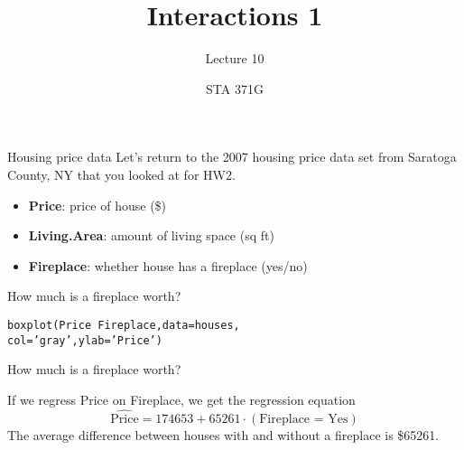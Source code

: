 \documentclass{beamer}\usepackage[]{graphicx}\usepackage[]{color}
\title{Interactions 1}
\subtitle{Lecture 10}
\author{STA 371G}
\makeatletter
\newcommand{\hlstr}[1]{\textcolor[rgb]{1,0.894,0.71}{#1}}%
\newcommand{\hlopt}[1]{\textcolor[rgb]{1,0.894,0.769}{#1}}%
\newcommand{\hlstd}[1]{\textcolor[rgb]{1,0.894,0.769}{#1}}%
\newcommand{\hlkwc}[1]{\textcolor[rgb]{0.78,0.941,0.545}{#1}}%
\newcommand{\hlkwd}[1]{\textcolor[rgb]{1,0.78,0.769}{#1}}%
\newenvironment{kframe}{%
 \def\at@end@of@kframe{}%
 \ifinner\ifhmode%
  \def\at@end@of@kframe{\end{minipage}}%
  \begin{minipage}{\columnwidth}%
 \fi\fi%
 \def\FrameCommand##1{\hskip\@totalleftmargin \hskip-\fboxsep
 \colorbox{shadecolor}{##1}\hskip-\fboxsep
     \hskip-\linewidth \hskip-\@totalleftmargin \hskip\columnwidth}%
 \MakeFramed {\advance\hsize-\width
   \@totalleftmargin\z@ \linewidth\hsize
   \@setminipage}}%
 {\par\unskip\endMakeFramed%
 \at@end@of@kframe}
\newenvironment{knitrout}{}{} %
\makeatother
\begin{document}
  
  

  \frame{\maketitle}



  \begin{darkframes}
    \begin{frame}{Housing price data}
      Let's return to the 2007 housing price data set from Saratoga County, NY that you looked at for HW2.
      \begin{itemize}
        \item \textbf{Price}: price of house (\$)
        \item \textbf{Living.Area}: amount of living space (sq ft)
        \item \textbf{Fireplace}: whether house has a fireplace (yes/no)
      \end{itemize}
      \lc
    \end{frame}

    \begin{frame}[fragile]{How much is a fireplace worth?}
\begin{knitrout}
\begin{kframe}
\begin{alltt}
\hlkwd{boxplot}\hlstd{(Price} \hlopt{~} \hlstd{Fireplace,} \hlkwc{data}\hlstd{=houses,}
  \hlkwc{col}\hlstd{=}\hlstr{'gray'}\hlstd{,} \hlkwc{ylab}\hlstd{=}\hlstr{'Price'}\hlstd{)}
\end{alltt}
\end{kframe}


\end{knitrout}
    \end{frame}

    \begin{frame}[fragile]{How much is a fireplace worth?}
      

      If we regress Price on Fireplace, we get the regression equation
      \[
        \widehat{\text{Price}} = 174653 + 65261\cdot(\text{Fireplace = Yes})
      \]
      The average difference between houses with and without a fireplace is \$65261.
      \lc
    \end{frame}


\end{darkframes}
\end{document}
